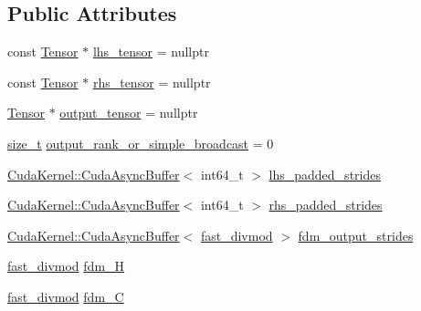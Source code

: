 \subsection*{Public Attributes}
\begin{DoxyCompactItemize}
\item 
const \mbox{\hyperlink{classonnxruntime_1_1Tensor}{Tensor}} $\ast$ \mbox{\hyperlink{structonnxruntime_1_1cuda_1_1BinaryElementwisePreparation_ad82404e3c1e95ec44efddff36e8e886a}{lhs\+\_\+tensor}} = nullptr
\item 
const \mbox{\hyperlink{classonnxruntime_1_1Tensor}{Tensor}} $\ast$ \mbox{\hyperlink{structonnxruntime_1_1cuda_1_1BinaryElementwisePreparation_a30db30553236d3694eb6442c2af7edb4}{rhs\+\_\+tensor}} = nullptr
\item 
\mbox{\hyperlink{classonnxruntime_1_1Tensor}{Tensor}} $\ast$ \mbox{\hyperlink{structonnxruntime_1_1cuda_1_1BinaryElementwisePreparation_a8e5baa8a6c92e84c17e3e040ca9acdd2}{output\+\_\+tensor}} = nullptr
\item 
\mbox{\hyperlink{mlasi_8h_a503efbc1c6e50825320ad909366b78ab}{size\+\_\+t}} \mbox{\hyperlink{structonnxruntime_1_1cuda_1_1BinaryElementwisePreparation_ae6b234b7debc4cba40d21bbff24c18e6}{output\+\_\+rank\+\_\+or\+\_\+simple\+\_\+broadcast}} = 0
\item 
\mbox{\hyperlink{classonnxruntime_1_1cuda_1_1CudaKernel_1_1CudaAsyncBuffer}{Cuda\+Kernel\+::\+Cuda\+Async\+Buffer}}$<$ int64\+\_\+t $>$ \mbox{\hyperlink{structonnxruntime_1_1cuda_1_1BinaryElementwisePreparation_a3d6d41eac8f6f1d9d2a66262ef6abdcf}{lhs\+\_\+padded\+\_\+strides}}
\item 
\mbox{\hyperlink{classonnxruntime_1_1cuda_1_1CudaKernel_1_1CudaAsyncBuffer}{Cuda\+Kernel\+::\+Cuda\+Async\+Buffer}}$<$ int64\+\_\+t $>$ \mbox{\hyperlink{structonnxruntime_1_1cuda_1_1BinaryElementwisePreparation_ad4b9356d9ef8d6ce775abe0d269580b6}{rhs\+\_\+padded\+\_\+strides}}
\item 
\mbox{\hyperlink{classonnxruntime_1_1cuda_1_1CudaKernel_1_1CudaAsyncBuffer}{Cuda\+Kernel\+::\+Cuda\+Async\+Buffer}}$<$ \mbox{\hyperlink{classonnxruntime_1_1cuda_1_1fast__divmod}{fast\+\_\+divmod}} $>$ \mbox{\hyperlink{structonnxruntime_1_1cuda_1_1BinaryElementwisePreparation_a7abae73c49c51912d621e34ba336aef9}{fdm\+\_\+output\+\_\+strides}}
\item 
\mbox{\hyperlink{classonnxruntime_1_1cuda_1_1fast__divmod}{fast\+\_\+divmod}} \mbox{\hyperlink{structonnxruntime_1_1cuda_1_1BinaryElementwisePreparation_abac17f92f3658f4b478f2f534ce21d4f}{fdm\+\_\+H}}
\item 
\mbox{\hyperlink{classonnxruntime_1_1cuda_1_1fast__divmod}{fast\+\_\+divmod}} \mbox{\hyperlink{structonnxruntime_1_1cuda_1_1BinaryElementwisePreparation_ac07a5b9eca61fcc7295038038d306cda}{fdm\+\_\+C}}
\end{DoxyCompactItemize}


